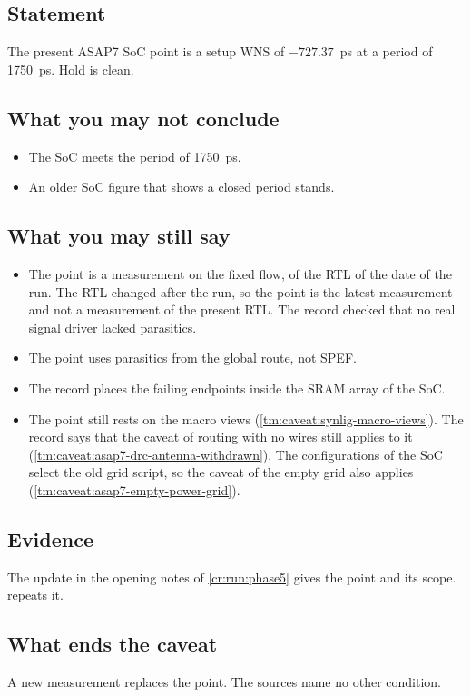 \subsection*{Statement}
The present ASAP7 SoC point is a setup WNS of $-727.37$~ps at a period of 1750~ps. Hold is clean.

\subsection*{What you may not conclude}
\begin{itemize}
  \item The SoC meets the period of 1750~ps.
  \item An older SoC figure that shows a closed period stands.
\end{itemize}

\subsection*{What you may still say}
\begin{itemize}
  \item The point is a measurement on the fixed flow, of the RTL of the date of the run. The RTL changed after the run, so the point is the latest measurement and not a measurement of the present RTL. The record checked that no real signal driver lacked parasitics.
  \item The point uses parasitics from the global route, not SPEF.
  \item The record places the failing endpoints inside the SRAM array of the SoC.
  \item The point still rests on the macro views (\cref{tm:caveat:synlig-macro-views}). The record says that the caveat of routing with no wires still applies to it (\cref{tm:caveat:asap7-drc-antenna-withdrawn}). The configurations of the SoC select the old grid script, so the caveat of the empty grid also applies (\cref{tm:caveat:asap7-empty-power-grid}).
\end{itemize}

\subsection*{Evidence}
The update in the opening notes of \cref{cr:run:phase5} gives the point and its scope.  repeats it.

\subsection*{What ends the caveat}
A new measurement replaces the point. The sources name no other condition.

